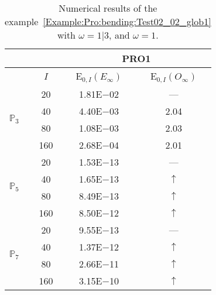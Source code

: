 \begin{table}[H]
\caption{Numerical results of the example~\ref{Example:Pro:bending:Test02_02_glob1} with $\omega=1|3$, and $\omega=1$.}
\setlength{\tabcolsep}{5pt}
\centering
\begin{tabular}{@{}l c c c@{}}
\toprule
 &  & \multicolumn{2}{c}{PRO1}\\
\midrule
 & $I$ & E$_{0,I}(E_{\infty})$ & E$_{0,I}(O_{\infty})$\\
\midrule
\multirow{4}{*}{$\mathbb{P}_{3}$} & 20 & 1.81E$-$02 & ---\\
 & 40 & 4.40E$-$03 & 2.04\\
 & 80 & 1.08E$-$03 & 2.03\\
 & 160 & 2.68E$-$04 & 2.01\\
\midrule
\multirow{4}{*}{$\mathbb{P}_{5}$} & 20 & 1.53E$-$13 & ---\\
 & 40 & 1.65E$-$13 & $\uparrow$\\
 & 80 & 8.49E$-$13 & $\uparrow$\\
 & 160 & 8.50E$-$12 & $\uparrow$\\
\midrule
\multirow{4}{*}{$\mathbb{P}_{7}$} & 20 & 9.55E$-$13 & ---\\
 & 40 & 1.37E$-$12 & $\uparrow$\\
 & 80 & 2.66E$-$11 & $\uparrow$\\
 & 160 & 3.15E$-$10 & $\uparrow$\\
\bottomrule
\end{tabular}
\label{Table:PRO:test_02_02_test10}
\end{table}
